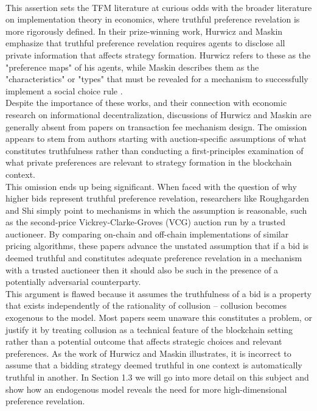 \documentclass[11pt,a4paper]{llncs}
\begin{document}
\vspace{0.2cm} \\
This assertion sets the TFM literature at curious odds with the broader literature on implementation theory in economics, where truthful preference revelation is more rigorously defined. In their prize-winning work, Hurwicz and Maskin emphasize that truthful preference revelation requires agents to disclose all private information that affects strategy formation. Hurwicz refers to these as the "preference maps" of his agents, while Maskin describes them as the "characteristics" or "types" that must be revealed for a mechanism to successfully implement a social choice rule \cite{hurwicz1973design, hurwicz1960optimality, hurwicz2007guardians, hurwicz1979allocations, maskin1999nash, maskin2002}.
\vspace{0.2cm} \\
Despite the importance of these works, and their connection with economic research on informational decentralization, discussions of Hurwicz and Maskin are generally absent from papers on transaction fee mechanism design. The omission appears to stem from authors starting with auction-specific assumptions of what constitutes truthfulness rather than conducting a first-principles examination of what private preferences are relevant to strategy formation in the blockchain context.
\vspace{0.2cm} \\
This omission ends up being significant. When faced with the question of why higher bids represent truthful preference revelation, researchers like Roughgarden and Shi simply point to mechanisms in which the assumption is reasonable, such as the second-price Vickrey-Clarke-Groves (VCG) auction run by a trusted auctioneer. By comparing on-chain and off-chain implementations of similar pricing algorithms, these papers advance the unstated assumption that if a bid is deemed truthful and constitutes adequate preference revelation in a mechanism with a trusted auctioneer then it should also be such in the presence of a potentially adversarial counterparty.
\vspace{0.2cm} \\
This argument is flawed because it assumes the truthfulness of a bid is a property that exists independently of the rationality of collusion -- collusion becomes exogenous to the model. Most papers seem unaware this constitutes a problem, or justify it by treating collusion as a technical feature of the blockchain setting rather than a potential outcome that affects strategic choices and relevant preferences. As the work of Hurwicz and Maskin illustrates, it is incorrect to assume that a bidding strategy deemed truthful in one context is automatically truthful in another. In Section 1.3 we will go into more detail on this subject and show how an endogenous model reveals the need for more high-dimensional preference revelation.
\end{document}
